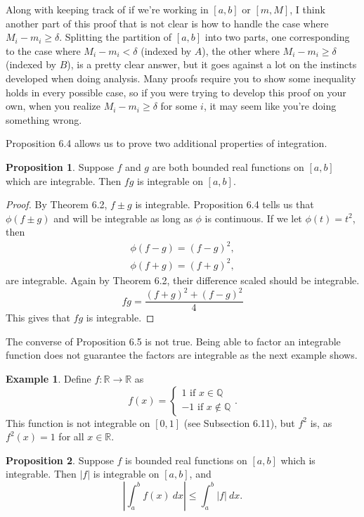 \documentclass{article}
\newcommand{\R}{\mathbb{R}}
\newcommand{\Q}{\mathbb{Q}}
\theoremstyle{definition}
\newtheorem{proposition}{Proposition}[section]
\newtheorem{example}{Example}[section]
\begin{document}
	Along with keeping track of if we're working in $ [a,b] $ or $ [m,M] $, I think another part of this proof that is not clear is how to handle the case where $ M_i-m_i\ge\delta $. Splitting the partition of $ [a,b] $ into two parts, one corresponding to the case where $  M_i-m_i<\delta $ (indexed by $ A $), the other where $  M_i-m_i\ge\delta $ (indexed by $ B $), is a pretty clear answer, but it goes against a lot on the instincts developed when doing analysis. Many proofs require you to show some inequality holds in every possible case, so if you were trying to develop this proof on your own, when you realize $  M_i-m_i\ge\delta $ for some $ i $, it may seem like you're doing something wrong.
	
	Proposition 6.4 allows us to prove two additional properties of integration.
	\begin{proposition}
		Suppose $ f $ and $ g $ are both bounded real functions on $ [a,b] $ which are integrable. Then $ fg $ is integrable on $ [a,b] $.
	\end{proposition}
	\begin{proof}
		By Theorem 6.2, $ f\pm g $ is integrable. Proposition 6.4 tells us that $ \phi(f\pm g) $ and will be integrable as long as $ \phi $ is continuous. If we let $ \phi(t)=t^2 $, then \begin{align*}
			\phi(f-g)=(f-g)^2,\\\phi(f+g)=(f+g)^2,
		\end{align*} are integrable. Again by Theorem 6.2, their difference scaled should be integrable. $$fg=\frac{(f+g)^2+(f-g)^2}{4} $$ This gives that $ fg $ is integrable. 
	\end{proof}
	The converse of Proposition 6.5 is not true. Being able to factor an integrable function does not guarantee the factors are integrable as the next example shows.
	\begin{example}
		Define $ f:\R\to\R $ as $$f(x)=\begin{cases}
			1\text{ if }x\in\Q\\-1\text{ if }x\notin\Q
		\end{cases}. $$ 
		This function is not integrable on $ [0,1] $ (see Subsection 6.11), but $ f^2 $ is, as $ f^2(x)=1 $ for all $ x\in\R $. 	
	\end{example}
	\begin{proposition}
		Suppose $ f $ is bounded real functions on $ [a,b] $ which is integrable. Then $ |f| $ is integrable on $ [a,b] $, and $$\left\lvert\int_{a}^{b}f(x)\ dx \right\rvert\le \int_{a}^{b}|f|\ dx. $$
	\end{proposition}
\end{document}
